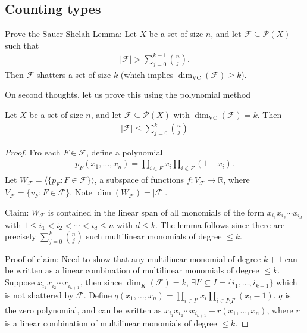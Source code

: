 \documentclass{article}
\begin{document}
\subsection{Counting types}
\begin{ex}
  Prove the Sauer-Shelah Lemma:
  Let $X$ be a set of size $n$, and let $\mathcal{F} \subseteq \mathcal{P}(X)$ such that
  \begin{align*}
    |\mathcal{F}| > \sum_{j=0}^{k-1} \binom{n}{j}.
  \end{align*}
  Then $\mathcal{F}$ shatters a set of size $k$ (which implies $\dim_{\text{VC}}(\mathcal{F}) \geq k$).
\end{ex}
\newlec
On second thoughts, let us prove this using the polynomial method
\begin{lemma}
  Let $X$ be a set of size $n$, and let $\mathcal{F} \subseteq \mathcal{P}(X)$ with $\dim_{\text{VC}}(\mathcal{F}) = k$.
  Then
  \begin{align*}
    |\mathcal{F}| \leq \sum_{j=0}^k \binom{n}{j}
  \end{align*}
\end{lemma}
\begin{proof}
  Fro each $F \in \mathcal{F}$, define a polynomial
  \begin{align*}
    p_F(x_1, \dotsc, x_n) = \prod_{i \in F} x_i \prod_{i \notin F}(1-x_i).
  \end{align*}
  Let $W_{\mathcal{F}} = \langle \{p_F : F \in \mathcal{F}\} \rangle$, a subspace of functions $f: V_{\mathcal{F}} \to \mathbb{R}$, where $V_{\mathcal{F}} = \{v_F: F \in \mathcal{F}\}$. Note $\dim(W_{\mathcal{F}}) = |\mathcal{F}|$.

  Claim: $W_{\mathcal{F}}$ is contained in the linear span of all monomials of the form $x_{i_1} x_{i_2} \dotsm x_{i_d}$ with $1 \leq i_1 < i_2 < \dotsb < i_d \leq n$ with $d \leq k$.
  The lemma follows since there are precisely $\sum_{j=0}^k \binom{n}{j}$ such multilinear monomials of degree $\leq k$.

  Proof of claim: Need to show that any multilinear monomial of degree $k+1$ can be written as a linear combination of multilinear monomials of degree $\leq k$.
  Suppose $x_{i_1} x_{i_2} \dotsm x_{i_{k+1}}$, then since $\dim_K(\mathcal{F}) = k$,
  $\exists I' \subseteq I = \{i_1, \dotsc, i_{k+1}\}$ which is not shattered by $\mathcal{F}$.
  Define $q(x_1, \dotsc, x_n) = \prod_{i \in I'} x_i \prod_{i \in I \setminus I'} (x_i-1)$.
  $q$ is the zero polynomial, and can be written as $x_{i_1} x_{i_2} \dotsm x_{i_{k+1}} + r(x_1, \dotsc, x_n)$, where $r$ is a linear combination of multilinear monomials of degree $\leq k$.
\end{proof}
\end{document}
